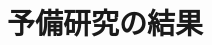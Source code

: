 \documentclass[thesis]{subfiles}
\begin{document}
\renewcommand{\prechaptername}{付録}
\renewcommand{\postchaptername}{}
\renewcommand{\thechapter}{\Alph{chapter}}
\setcounter{chapter}{0}

\chapter{予備研究の結果}
\end{document}
